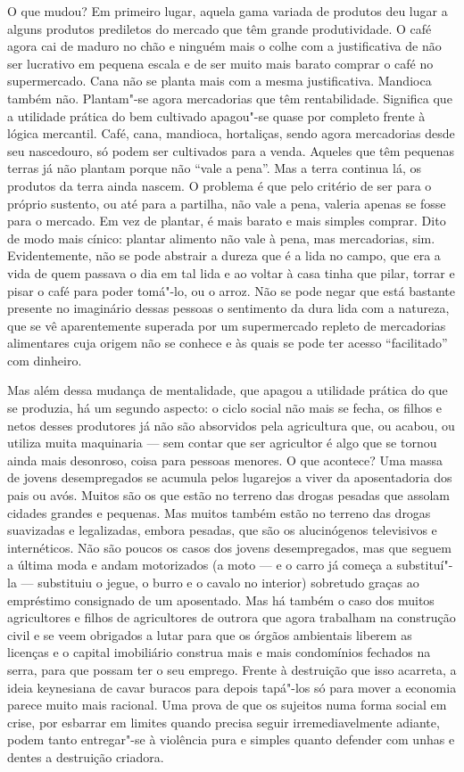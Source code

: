 O que mudou? Em primeiro lugar, aquela gama variada de produtos deu
lugar a alguns produtos prediletos do mercado que têm grande
produtividade. O café agora cai de maduro no chão e ninguém mais o colhe
com a justificativa de não ser lucrativo em pequena escala e de ser
muito mais barato comprar o café no supermercado. Cana não se planta
mais com a mesma justificativa. Mandioca também não. Plantam"-se agora
mercadorias que têm rentabilidade. Significa que a utilidade prática do
bem cultivado apagou"-se quase por completo frente à lógica mercantil.
Café, cana, mandioca, hortaliças, sendo agora mercadorias desde seu
nascedouro, só podem ser cultivados para a venda. Aqueles que têm
pequenas terras já não plantam porque não ``vale a pena''. Mas a terra
continua lá, os produtos da terra ainda nascem. O problema é que pelo
critério de ser para o próprio sustento, ou até para a partilha, não
vale a pena, valeria apenas se fosse para o mercado. Em vez de plantar,
é mais barato e mais simples comprar. Dito de modo mais cínico: plantar
alimento não vale à pena, mas mercadorias, sim. Evidentemente, não se
pode abstrair a dureza que é a lida no campo, que era a vida de quem
passava o dia em tal lida e ao voltar à casa tinha que pilar, torrar e
pisar o café para poder tomá"-lo, ou o arroz. Não se pode negar que está
bastante presente no imaginário dessas pessoas o sentimento da dura lida
com a natureza, que se vê aparentemente superada por um supermercado
repleto de mercadorias alimentares cuja origem não se conhece e às quais
se pode ter acesso ``facilitado'' com dinheiro.

Mas além dessa mudança de mentalidade, que apagou a utilidade prática do
que se produzia, há um segundo aspecto: o ciclo social não mais se
fecha, os filhos e netos desses produtores já não são absorvidos pela
agricultura que, ou acabou, ou utiliza muita maquinaria --- sem contar
que ser agricultor é algo que se tornou ainda mais desonroso, coisa para
pessoas menores. O que acontece? Uma massa de jovens desempregados se
acumula pelos lugarejos a viver da aposentadoria dos pais ou avós.
Muitos são os que estão no terreno das drogas pesadas que assolam
cidades grandes e pequenas. Mas muitos também estão no terreno das
drogas suavizadas e legalizadas, embora pesadas, que são os alucinógenos
televisivos e internéticos. Não são poucos os casos dos jovens
desempregados, mas que seguem a última moda e andam motorizados (a moto
--- e o carro já começa a substituí"-la --- substituiu o jegue, o burro e o
cavalo no interior) sobretudo graças ao empréstimo consignado de um
aposentado. Mas há também o caso dos muitos agricultores e filhos de
agricultores de outrora que agora trabalham na construção civil e se
veem obrigados a lutar para que os órgãos ambientais liberem as licenças
e o capital imobiliário construa mais e mais condomínios fechados na
serra, para que possam ter o seu emprego. Frente à destruição que isso
acarreta, a ideia keynesiana de cavar buracos para depois tapá"-los só
para mover a economia parece muito mais racional. Uma prova de que os
sujeitos numa forma social em crise, por esbarrar em limites quando precisa seguir
irremediavelmente adiante, podem tanto entregar"-se à violência pura e
simples quanto defender com unhas e dentes a destruição criadora.

